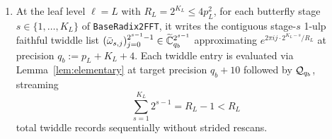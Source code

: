 \begin{enumerate}[label=(\alph*),leftmargin=*]
  \[
    \bigl(\mu(u_2),\, \hat{\rho}(u_2),\, \hat{\theta}(u_2)\bigr) := \bigl(\mu(r_\ell - u_2),\, \hat{\rho}(r_\ell - u_2),\, \hat{\theta}(r_\ell - u_2)\bigr).
  \]
  At the Nyquist column $u_2 = r_\ell / 2$, \texttt{NyquistSolve} reads only the Nyquist reciprocal $\mu_{\mathrm{N}} := \mu(r_\ell/2) \approx c^{-1}$, evaluated via Lemma~\ref{lem:elementary} at $s = q_{\mathrm{child}} + 10$ and rounded via $\Quant_{q_{\mathrm{child}}}$, with placeholder values $(\hat{\rho}(r_\ell/2), \hat{\theta}(r_\ell/2)) := (-1, 0)$.
  \item At the leaf level $\ell = L$ with $R_L = 2^{K_L} \le 4 p_L^2$, for each butterfly stage $s \in \{1, \dots, K_L\}$ of \texttt{BaseRadix2FFT}, it writes the contiguous stage-$s$ 1-ulp faithful twiddle list $(\bar{\omega}_{s, j})_{j=0}^{2^{s-1}-1} \in \widetilde{\mathbb{C}}_{q_b}^{2^{s-1}}$ approximating $e^{2\pi i j \cdot 2^{K_L - s} / R_L}$ at precision $q_b := p_L + K_L + 4$. Each twiddle entry is evaluated via Lemma~\ref{lem:elementary} at target precision $q_b + 10$ followed by $\mathcal{Q}_{q_b}$, streaming
  \[
    \sum_{s=1}^{K_L} 2^{s-1} = R_L - 1 < R_L
  \]
  total twiddle records sequentially without strided rescans.
\end{enumerate}


